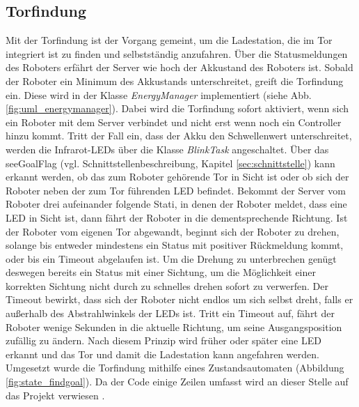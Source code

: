 \subsection{Torfindung}
\label{sec:torfindung}
Mit der Torfindung ist der Vorgang gemeint, um die Ladestation, die im Tor integriert ist zu finden und selbstständig anzufahren. Über die Statusmeldungen des Roboters erfährt der Server wie hoch der Akkustand des Roboters ist. Sobald der Roboter ein Minimum des Akkustands unterschreitet, greift die Torfindung ein. Diese wird in der Klasse \textit{EnergyManager} implementiert (siehe Abb. \ref{fig:uml_energymanager}). Dabei wird die Torfindung sofort aktiviert, wenn sich ein Roboter mit dem Server verbindet und nicht erst wenn noch ein Controller hinzu kommt. Tritt der Fall ein, dass der Akku den Schwellenwert unterschreitet, werden die Infrarot-LEDs über die Klasse \textit{BlinkTask} angeschaltet. Über das \glqq seeGoal\grqq Flag (vgl. Schnittstellenbeschreibung, Kapitel \ref{sec:schnittstelle}) kann erkannt werden, ob das zum Roboter gehörende Tor in Sicht ist oder ob sich der Roboter neben der zum Tor führenden LED befindet. Bekommt der Server vom Roboter drei aufeinander folgende Stati, in denen der Roboter meldet, dass eine LED in Sicht ist, dann fährt der Roboter in die dementsprechende Richtung. Ist der Roboter vom eigenen Tor abgewandt, beginnt sich der Roboter zu drehen, solange bis entweder mindestens ein Status mit positiver Rückmeldung kommt, oder bis ein Timeout abgelaufen ist. Um die Drehung zu unterbrechen genügt deswegen bereits ein Status mit einer Sichtung, um die Möglichkeit einer korrekten Sichtung nicht durch zu schnelles drehen sofort zu verwerfen. Der Timeout bewirkt, dass sich der Roboter nicht endlos um sich selbst dreht, falls er außerhalb des Abstrahlwinkels der LEDs ist. Tritt ein Timeout auf, fährt der Roboter wenige Sekunden in die aktuelle Richtung, um seine Ausgangsposition zufällig zu ändern. Nach diesem Prinzip wird früher oder später eine LED erkannt und das Tor und damit die Ladestation kann angefahren werden. \\ Umgesetzt wurde die Torfindung mithilfe eines Zustandsautomaten (Abbildung \ref{fig:state_findgoal}). Da der Code einige Zeilen umfasst wird an dieser Stelle auf das Projekt verwiesen \cite{PROJEKT}.

